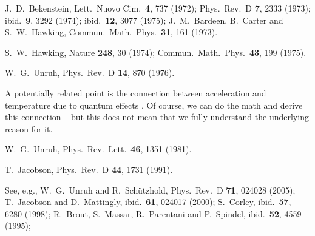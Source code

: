 \documentclass[12pt,aps,prl,showpacs,amssymb,nofootinbib,onecolumn]{revtex4-2}
\begin{document}
\begin{thebibliography}{499}

J.~D.~Bekenstein,
Lett.\ Nuovo Cim.\ {\bf 4}, 737 (1972);
Phys.\ Rev.\ D {\bf 7}, 2333 (1973);
ibid.\ {\bf 9}, 3292 (1974);
ibid.\ {\bf 12}, 3077 (1975);
%
J.~M.~Bardeen, B.~Carter and S.~W.~Hawking,
Commun.\ Math.\ Phys.\ {\bf 31}, 161 (1973).

S.~W.~Hawking,
Nature {\bf 248}, 30 (1974);
Commun.\ Math.\ Phys.\ {\bf 43}, 199 (1975).

W.~G.~Unruh,
Phys.\ Rev.\ D {\bf 14}, 870 (1976).

A potentially related point is the connection between acceleration and  
temperature due to quantum effects \cite{unruh}.
%
Of course, we can do the math and derive this connection -- but this
does not mean that we fully understand the underlying reason for it. 

W.~G.~Unruh,
Phys.\ Rev.\ Lett.\ {\bf 46}, 1351 (1981).

T.~Jacobson,
Phys.\ Rev.\ D {\bf 44}, 1731 (1991).
%
%

See, e.g.,
W.~G.~Unruh and R.~Sch\"utzhold,
Phys.\ Rev.\ D {\bf 71}, 024028 (2005);
%
T.~Jacobson and D.~Mattingly,
ibid.\ {\bf 61}, 024017 (2000);
%
S.~Corley,
ibid.\ {\bf 57}, 6280 (1998);
%
R.~Brout, S.~Massar, R.~Parentani and P.~Spindel,
ibid.\ {\bf 52}, 4559 (1995);


\end{thebibliography}
\end{document}

